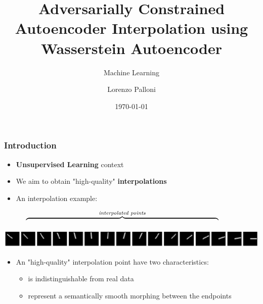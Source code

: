 \documentclass{beamer}
\title[ML - 2019/20 - Lorenzo Palloni]{Adversarially Constrained Autoencoder Interpolation using Wasserstein Autoencoder}
\subtitle{Machine Learning}
\author{Lorenzo Palloni}
\institute[]{
    University of Florence\\
    \medskip
    \textit{lorenzo.palloni@stud.unifi.it }
}
\date{\today}
\begin{document}
\begin{frame}
\titlepage %
\end{frame}

\begin{frame}
\frametitle{Introduction}
\begin{itemize}
  \item \textbf{Unsupervised Learning} context
  \medskip
  \item We aim to obtain "high-quality" \textbf{interpolations}
  \medskip
  \item An interpolation example:
\end{itemize}
\ \ \ \ \ \ $\overbrace{\ \ \ \ \ \ \ \ \ \ \ \ \ \ \ \ \ \ \ \ \ \ \ \ \ \ \ \ \ \ \ \ \ \ \ \ \ \ \ \ \ \ \ \ \ \ \ \ \ \ \ \ \ \ \ \ \ \ \ \ \ \ \ \ \ \ \ \ \ \ \ \ \ \ \ \ \ \ \ \ \ \ }^{\text{\textit{interpolated points}}}$
\vspace*{-\baselineskip}
\medskip
\begin{center}
  \includegraphics[width=1.0\textwidth,keepaspectratio]{./figures/perfect_interpolations}
\end{center}
\vspace*{-\baselineskip}
\begin{noindent}
  \rlap{\ \ $\nwarrow$} \hfill \llap{$\nearrow$\ \ }
\end{noindent}

\begin{noindent}
   \hfill {}
\end{noindent}
\medskip
\begin{itemize}
  \item An "high-quality" interpolation point have two characteristics:
  \medskip
  \begin{itemize}
    \item is indistinguishable from real data
    \medskip
    \item represent a semantically smooth morphing between the endpoints
  \end{itemize}
\end{itemize}
\end{frame}
\end{document}
